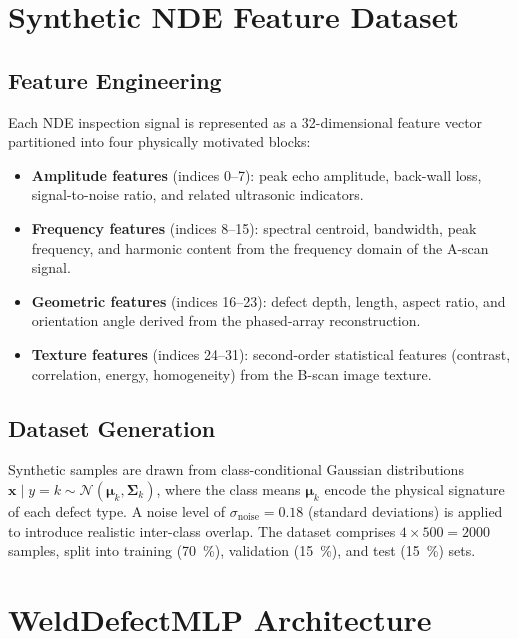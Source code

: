\section{Synthetic NDE Feature Dataset}
\label{sec:adv_data}

\subsection{Feature Engineering}
\label{subsec:adv_features}

Each NDE inspection signal is represented as a 32-dimensional feature
vector partitioned into four physically motivated blocks:

\begin{itemize}
  \item \textbf{Amplitude features} (indices 0--7): peak echo amplitude,
    back-wall loss, signal-to-noise ratio, and related ultrasonic
    indicators.
  \item \textbf{Frequency features} (indices 8--15): spectral centroid,
    bandwidth, peak frequency, and harmonic content from the frequency
    domain of the A-scan signal.
  \item \textbf{Geometric features} (indices 16--23): defect depth, length,
    aspect ratio, and orientation angle derived from the phased-array
    reconstruction.
  \item \textbf{Texture features} (indices 24--31): second-order statistical
    features (contrast, correlation, energy, homogeneity) from the
    B-scan image texture.
\end{itemize}

\subsection{Dataset Generation}
\label{subsec:adv_dataset}

Synthetic samples are drawn from class-conditional Gaussian distributions
$\bm{x} \mid y = k \sim \mathcal{N}(\bm{\mu}_k, \bm{\Sigma}_k)$, where
the class means $\bm{\mu}_k$ encode the physical signature of each defect
type.  A noise level of $\sigma_\mathrm{noise} = \num{0.18}$ (standard
deviations) is applied to introduce realistic inter-class overlap.  The
dataset comprises $4 \times \num{500} = \num{2000}$ samples, split into
training (\SI{70}{\percent}), validation (\SI{15}{\percent}), and test
(\SI{15}{\percent}) sets.

\section{WeldDefectMLP Architecture}
\label{sec:adv_model}

